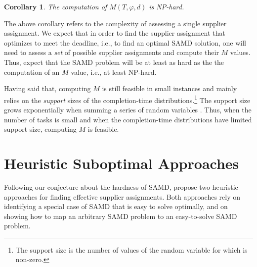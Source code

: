 \documentclass[letterpaper]{article} %
\newtheorem{corollary}{Corollary}
\newcommand{\samd}{\ac{SAMD}\xspace}
\newcommand\Tal[1]{\nb{\textbf{Tal:}}{green}{#1}}
\newcommand\Roni[1]{\nb{\textbf{Roni:}}{blue}{#1}}
\begin{document}


\begin{corollary}
The computation of $M(T, \varphi, d)$ is NP-hard.
\label{cor:m}
\end{corollary}
The above corollary refers to the complexity of assessing a single supplier assignment. We expect that in order to find the supplier assignment that optimizes to meet the deadline, i.e., to find an optimal \samd solution, one will need to assess a \emph{set} of possible supplier assignments and compute their $M$ values. Thus,  expect that the \samd problem will be at least as hard as the the computation of an $M$ value, i.e., at least NP-hard.



Having said that, computing $M$ is still feasible in small instances and mainly relies on the \emph{support} sizes of the completion-time distributions.\footnote{The support size is the number of values of the random variable for which is non-zero.} The support size grows exponentially when summing a series of random variables \cite{cohen2015estimating}. Thus, when the number of tasks is small and when the completion-time distributions have limited support size, computing $M$ is feasible.

\section{Heuristic Suboptimal Approaches}

Following our conjecture about the hardness of \samd,  propose two heuristic approaches for finding effective supplier assignments. Both approaches rely on identifying a special case of \samd that is easy to solve optimally, and on showing how to map an arbitrary \samd problem to an easy-to-solve \samd problem.
\end{document}
